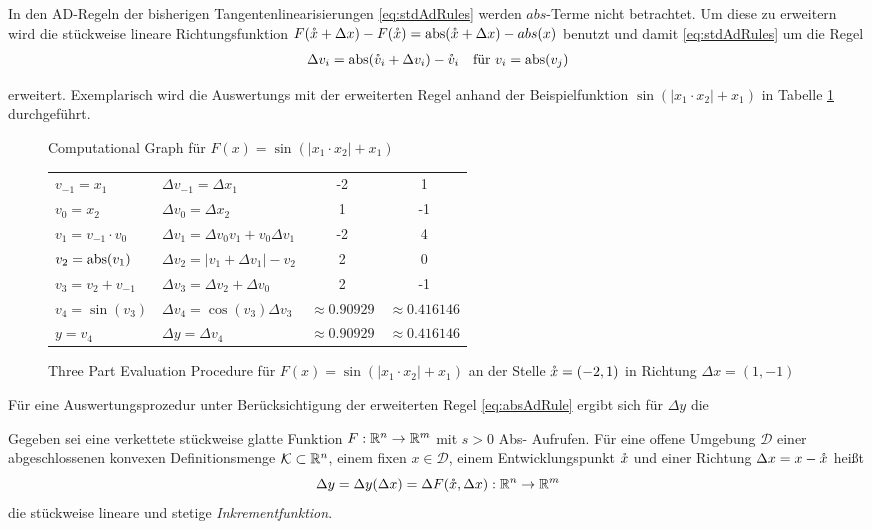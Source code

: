 In den AD-Regeln der bisherigen Tangentenlinearisierungen \eqref{eq:stdAdRules} werden $abs$-Terme nicht betrachtet. Um diese zu erweitern wird
die stückweise lineare Richtungsfunktion $F(\mathring{x} + \Delta x) - F(\mathring{x}) = \operatorname{abs}(\mathring{x}+\Delta x) - abs(x)$ benutzt und damit \eqref{eq:stdAdRules} um die Regel
\begin{equation}
\label{eq:absAdRule}
\begin{aligned}
 \Delta v_i &= \operatorname{abs}(\mathring{v}_i+ \Delta v_i) - \mathring{v}_i &\text{für } v_i = \operatorname{abs}(v_j)
 \end{aligned}
\end{equation}

erweitert. Exemplarisch wird die Auswertungs mit der erweiterten Regel anhand der Beispielfunktion $\sin(|x_1\cdot x_2|+x_1)$ in Tabelle \ref{fig:computationalGraphTable} durchgeführt.
\begin{figure}
\centering
 
 \caption{Computational Graph für $F(x) = \sin(|x_1\cdot x_2|+x_1)$}
\label{fig:computationalGraph} 
 \begin{tabular}{|l|l||c|c|}
 \hline
 $v_{-1} =  x_1$ 		&$\Delta v_{-1} = \Delta x_1$ & -2 & 1	\\
 $v_{0} =  x_2$ 		&$\Delta v_{0} = \Delta x_2$&1 &-1	\\
 \hline
 $v_{1} = v_{-1}\cdot v_{0}$ 	&$\Delta v_{1} = \Delta v_{0}v_1 + v_0 \Delta v_{1}$&-2&4\\
 $v_{2} =  \operatorname{abs}(v_{1})$		&$\Delta v_{2} =  |v_1 + \Delta v_1| - v_2$&2&0\\
 $v_{3} =  v_2+v_{-1}$ 		&$\Delta v_{3} = \Delta v_2 + \Delta v_0$&2&-1\\
 $v_{4} =  \sin(v_{3})$ 	&$\Delta v_{4} = \cos(v_3) \Delta v_3$&$\approx 0.90929$& $\approx 0.416146$ \\
 \hline
 $y =  v_{4}$ & $\Delta y = \Delta v_4$&$\approx 0.90929$& $\approx 0.416146$ \\
 \hline
\end{tabular}
\caption{Three Part Evaluation Procedure für $F(x) = \sin(|x_1\cdot x_2|+x_1)$ an der Stelle $\mathring{x} = (-2,1)$ in Richtung $\Delta x = (1,-1)$}
\label{fig:computationalGraphTable}
\end{figure}
Für eine Auswertungsprozedur unter Berücksichtigung der erweiterten Regel \eqref{eq:absAdRule} ergibt sich für $\Delta y$ \cite[S.9]{monster} die
\begin{definition}[Inkrementfunktion]
\label{def:incrementFunction}
Gegeben sei eine verkettete stückweise glatte Funktion $F:\mathbb{R}^n\to\mathbb{R}^m$ mit $s>0$ Abs- Aufrufen. Für eine offene Umgebung $\mathcal D$ einer abgeschlossenen konvexen Definitionsmenge $\mathcal K \subset \mathbb{R}^n$, einem fixen $x\in \mathcal D$, einem Entwicklungspunkt $\mathring{x}$ und einer Richtung $\Delta x = x-\mathring{x}$ heißt 
\[
\Delta y = \Delta y (\Delta x) = \Delta F(\mathring{x},\Delta x):\mathbb{R}^n \to \mathbb{R}^m
\]
die stückweise lineare und stetige \textit{Inkrementfunktion}.
\end{definition}

